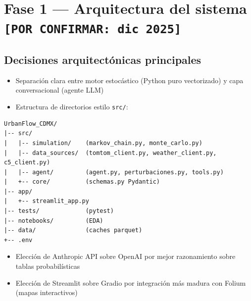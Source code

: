 \documentclass[11pt,a4paper]{article}
\begin{document}
\section{Fase 1 --- Arquitectura del sistema \texttt{[POR CONFIRMAR: dic 2025]}}

\subsection{Decisiones arquitectónicas principales}
\begin{itemize}
  \item Separación clara entre motor estocástico (Python puro vectorizado) y capa conversacional (agente LLM)
  \item Estructura de directorios estilo \texttt{src/}:
\end{itemize}

\begin{lstlisting}
UrbanFlow_CDMX/
|-- src/
|   |-- simulation/    (markov_chain.py, monte_carlo.py)
|   |-- data_sources/  (tomtom_client.py, weather_client.py, c5_client.py)
|   |-- agent/         (agent.py, perturbaciones.py, tools.py)
|   +-- core/          (schemas.py Pydantic)
|-- app/
|   +-- streamlit_app.py
|-- tests/             (pytest)
|-- notebooks/         (EDA)
|-- data/              (caches parquet)
+-- .env
\end{lstlisting}

\begin{itemize}
  \item Elección de Anthropic API sobre OpenAI por mejor razonamiento sobre tablas probabilísticas
  \item Elección de Streamlit sobre Gradio por integración más madura con Folium (mapas interactivos)
\end{itemize}
\end{document}
